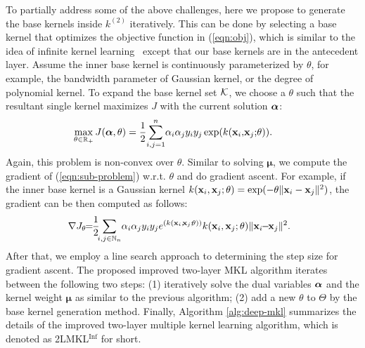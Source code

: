 To partially address some of the above challenges, here we propose to generate the base kernels inside $k^{(2)}$ iteratively. This can be done by selecting a base kernel that optimizes the objective function in (\ref{eqn:obj}), which
is similar to the idea of infinite kernel learning~\cite{colt/ArgyriouMP05,tr/GehlerN08} except that our base kernels are in the antecedent layer. Assume the inner base kernel is continuously parameterized by $\theta$, for example, the bandwidth parameter of Gaussian kernel, or the degree of polynomial kernel. To expand the base kernel set ${\mathcal K}$, we choose a $\theta$ such that the resultant single kernel maximizes $J$ with the current solution ${\boldsymbol{\alpha}}$:
\begin{equation}
\max_{\theta\in\r_+}J(\bm\alpha,\theta) =
\frac{1}{2}\!\sum_{i, j = 1}^n \!\a_i\a_jy_iy_j\exp(k(\x_i,\! \x_j;\! \theta)). \quad\quad\label{eqn:sub-problem}
\end{equation}
Again, this problem is non-convex over $\theta$. Similar to solving $\bm\mu$, we compute the gradient of (\ref{eqn:sub-problem}) w.r.t. $\theta$ and do gradient ascent. For example, if the inner base kernel is a Gaussian kernel
$k({\bf x}_i, {\bf x}_j; \theta) = \exp(-\theta\|{\bf x}_i - {\bf x}_j\|^2)$, the gradient can be then computed as follows:
\begin{equation}\label{eqn:sub-problem_grad}
\hspace{-0.1in} \nabla J_\theta \hspace{-0.05in} = \hspace{-0.05in}\frac{1}{2}\hspace{-0.05in}\sum_{i,j\in\mathbb N_n}\!\a_i\a_jy_iy_j e^{(k(\x_i, \!\x_j; \! \theta))}k(\x_i, \x_j; \theta) \| \x_i \!\!-\!\! \x_j \|^2.
\end{equation}
After that, we employ a line search approach to determining the step size for gradient ascent. The proposed improved two-layer MKL algorithm iterates between the following two steps: (1) iteratively solve the dual variables ${\boldsymbol{\alpha}}$ and the kernel weight $\bm\mu$ as similar to the previous algorithm; (2) add a new $\theta$ to $\Theta$ by the base kernel generation method. Finally, Algorithm \ref{alg:deep-mkl} summarizes the details of the improved two-layer multiple kernel learning algorithm, which is denoted as 2LMKL$^{\mathrm{Inf}}$ for short.

